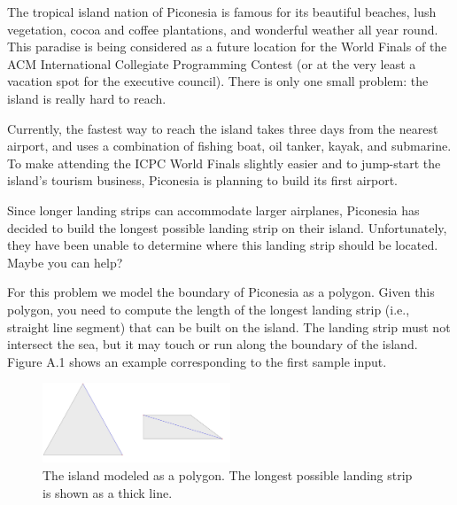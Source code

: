 

The tropical island nation of Piconesia is famous for its beautiful beaches, lush vegetation, cocoa and coffee plantations, and wonderful weather all year round. This paradise is being considered as a future location for the World Finals of the ACM International Collegiate Programming Contest (or at the very least a vacation spot for the executive council). There is only one small problem: the island is really hard to reach.
\vspace{.2cm}

Currently, the fastest way to reach the island takes three days from the nearest airport, and uses a combination of fishing boat, oil tanker, kayak, and submarine. To make attending the ICPC World Finals slightly easier and to jump-start the island’s tourism business, Piconesia is planning to build its first airport.
\vspace{.2cm}

Since longer landing strips can accommodate larger airplanes, Piconesia has decided to build the longest possible landing strip on their island. Unfortunately, they have been unable to determine where this landing strip should be located. Maybe you can help?

\vspace{.2cm}
For this problem we model the boundary of Piconesia as a polygon. Given this polygon, you need to compute the length of the longest landing strip (i.e., straight line segment) that can be built on the island. The landing strip must not intersect the sea, but it may touch or run along the boundary of the island. Figure A.1 shows an example corresponding to the first sample input.
\vspace{.2cm}

\begin{figure}[h]
	\centering
	\includegraphics[width=0.5\textwidth]{poly.png}
	\caption{The island modeled as a polygon. The longest possible landing strip is shown as a thick line.}
\end{figure}
\vspace{.2cm}


